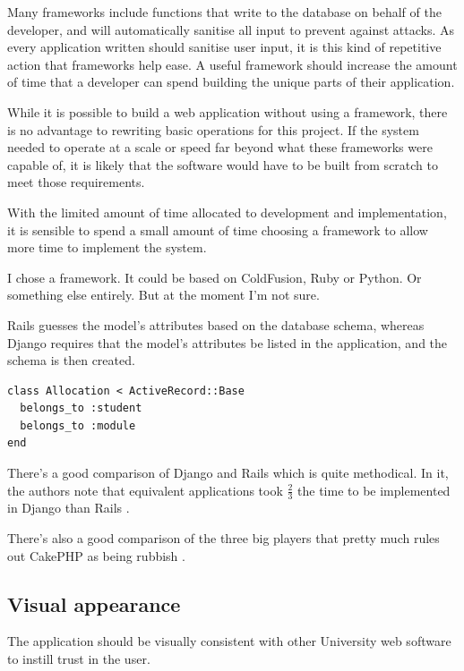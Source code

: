 \documentclass[]{scrartcl}
\begin{document}
Many frameworks include functions that write to the database on behalf of the developer, and will automatically sanitise all input to prevent against attacks. As every application written should sanitise user input, it is this kind of repetitive action that frameworks help ease. A useful framework should increase the amount of time that a developer can spend building the unique parts of their application.

While it is possible to build a web application without using a framework, there is no advantage to rewriting basic operations for this project. If the system needed to operate at a scale or speed far beyond what these frameworks were capable of, it is likely that the software would have to be built from scratch to meet those requirements.

With the limited amount of time allocated to development and implementation, it is sensible to spend a small amount of time choosing a framework to allow more time to implement the system.


I chose a framework. It could be based on ColdFusion, Ruby or Python. Or something else entirely. But at the moment I'm not sure.

Rails guesses the model's attributes based on the database schema, whereas Django requires that the model's attributes be listed in the application, and the schema is then created.

\begin{lstlisting}
class Allocation < ActiveRecord::Base
  belongs_to :student
  belongs_to :module
end
\end{lstlisting}

There's a good comparison of Django and Rails which is quite methodical. In it, the authors note that equivalent applications took $\frac{2}{3}$ the time to be implemented in Django than Rails \cite{RailsDjangoComparison_2007}.

There's also a good comparison of the three big players that pretty much rules out CakePHP as being rubbish \cite{EvalWebDevFrameworks_2009}.

\subsection{Visual appearance}

The application should be visually consistent with other University web software to instill trust in the user.
\end{document}
